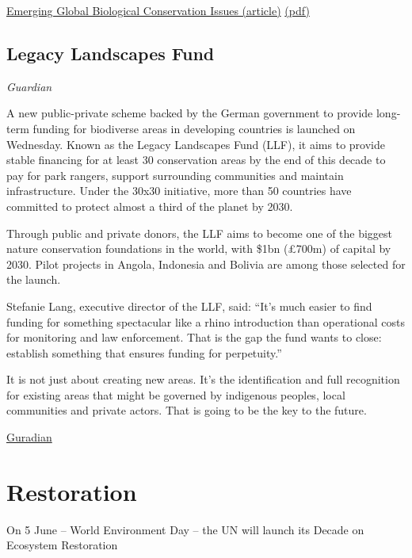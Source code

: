 \documentclass[
]{book}
\begin{document}
\href{https://www.cell.com/trends/ecology-evolution/fulltext/S0169-5347(20)30306-2}{Emerging Global Biological Conservation Issues (article)}
\href{/pdf/Sutherland_2020_Horizon_Scan_Biological_Conservation_Issues.pdf}{(pdf)}

\hypertarget{legacy-landscapes-fund}{%
\subsection{Legacy Landscapes Fund}\label{legacy-landscapes-fund}}

\emph{Guardian}

A new public-private scheme backed by the German government to provide long-term funding for biodiverse areas in developing countries is launched on Wednesday. Known as the Legacy Landscapes Fund (LLF), it aims to provide stable financing for at least 30 conservation areas by the end of this decade to pay for park rangers, support surrounding communities and maintain infrastructure. Under the 30x30 initiative, more than 50 countries have committed to protect almost a third of the planet by 2030.

Through public and private donors, the LLF aims to become one of the biggest nature conservation foundations in the world, with \$1bn (£700m) of capital by 2030. Pilot projects in Angola, Indonesia and Bolivia are among those selected for the launch.

Stefanie Lang, executive director of the LLF, said: ``It's much easier to find funding for something spectacular like a rhino introduction than operational costs for monitoring and law enforcement. That is the gap the fund wants to close: establish something that ensures funding for perpetuity.''

It is not just about creating new areas. It's the identification and full recognition for existing areas that might be governed by indigenous peoples, local communities and private actors. That is going to be the key to the future.

\href{https://www.theguardian.com/environment/2021/may/19/governments-achieve-10-year-target-of-protecting-17-percent-land-aoe}{Guradian}

\hypertarget{restoration}{%
\section{Restoration}\label{restoration}}

On 5 June -- World Environment Day -- the UN will launch its Decade on Ecosystem Restoration
\end{document}
